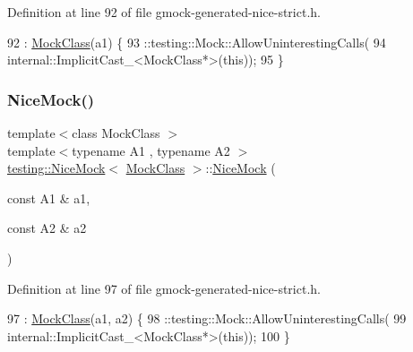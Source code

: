 Definition at line 92 of file gmock-\/generated-\/nice-\/strict.\+h.


\begin{DoxyCode}
92                                   : \hyperlink{classMockClass}{MockClass}(a1) \{
93     ::testing::Mock::AllowUninterestingCalls(
94         internal::ImplicitCast\_<MockClass*>(\textcolor{keyword}{this}));
95   \}
\end{DoxyCode}
\mbox{\label{classtesting_1_1NiceMock_a150837476e88f52772c8f85180b889a1}} 
\subsubsection{\texorpdfstring{Nice\+Mock()}{NiceMock()}\hspace{0.1cm}{\footnotesize\ttfamily [3/11]}}
{\footnotesize\ttfamily template$<$class Mock\+Class $>$ \\
template$<$typename A1 , typename A2 $>$ \\
\hyperlink{classtesting_1_1NiceMock}{testing\+::\+Nice\+Mock}$<$ \hyperlink{classMockClass}{Mock\+Class} $>$\+::\hyperlink{classtesting_1_1NiceMock}{Nice\+Mock} (\begin{DoxyParamCaption}\item[{const A1 \&}]{a1,  }\item[{const A2 \&}]{a2 }\end{DoxyParamCaption})\hspace{0.3cm}{\ttfamily [inline]}}



Definition at line 97 of file gmock-\/generated-\/nice-\/strict.\+h.


\begin{DoxyCode}
97                                        : \hyperlink{classMockClass}{MockClass}(a1, a2) \{
98     ::testing::Mock::AllowUninterestingCalls(
99         internal::ImplicitCast\_<MockClass*>(\textcolor{keyword}{this}));
100   \}
\end{DoxyCode}
\mbox{\label{classtesting_1_1NiceMock_a0b91bd74b497626bb81d07c3d4b59d22}} 
